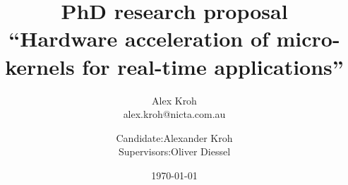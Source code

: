 

\title{PhD research proposal\\ ``Hardware acceleration of micro-kernels for real-time applications''}
\author{Alex Kroh \\ alex.kroh@nicta.com.au}

\author{\begin{tabular}{r@{ }l} 
Candidate:      & Alexander Kroh \\[1ex] 
Supervisors: & Oliver Diessel
\end{tabular}}
\date{\today}

\documentclass[10pt]{article}

\addtolength{\textheight}{4cm}
\addtolength{\topmargin}{-2cm}


\maketitle




Safety critical embedded systems, such as automotive air bag and braking systems, require a thorough
analysis of Worst Case Execution Time (WCET) to ensure adherence to strict timing requirements.
Performance enhancement features of modern CPUs and cache warmth lead to non-determinism in execution
time and result in a pessimistic estimate for WCET. The system engineer must over provision processing
resources to ensure that, in the unlikely event that the WCET is ever observed, the system will still
have sufficient processing resources to meet timing requirements and operate in a safe manner. For
this reason, processing resources are typically dramatically underutilised in safety critical embedded
systems.

